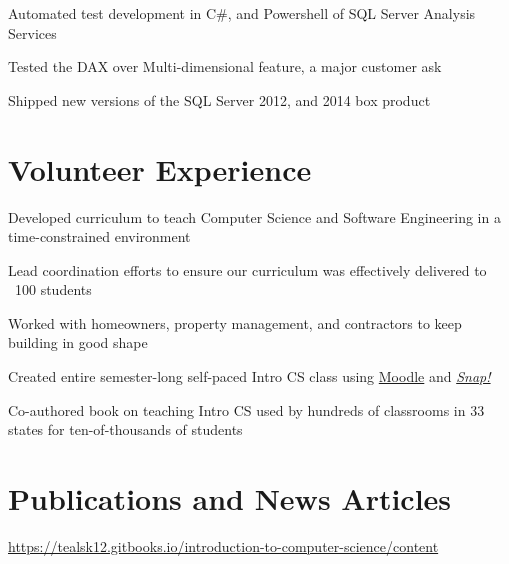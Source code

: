 \documentclass{resume}
\begin{document}
\begin{position}
  \item Automated test development in C\#, and Powershell of SQL Server Analysis Services
  \item Tested the DAX over Multi-dimensional feature, a major customer ask
  \item Shipped new versions of the SQL Server 2012, and 2014 box product 
\end{position}

\section{Volunteer Experience}
\begin{position}
  \item Developed curriculum to teach Computer Science and Software Engineering in a time-constrained environment
  \item Lead coordination efforts to ensure our curriculum was effectively delivered to ~100 students
\end{position}

\begin{position}
  \item Worked with homeowners, property management, and contractors to keep building in good shape
\end{position}

\begin{position}
  \item Created entire semester-long self-paced Intro CS class using \href{https://goo.gl/EcgyHc}{Moodle} and \href{https://goo.gl/1TerVz}{\emph{Snap!}}
  
  \item Co-authored book on teaching Intro CS used by hundreds of classrooms in 33 states for ten-of-thousands of students
\end{position}

\section{Publications and News Articles}
\begin{position}
  \item \href{https://goo.gl/GkcRjE}{https://tealsk12.gitbooks.io/introduction-to-computer-science/content}
\end{position}
\end{document}
